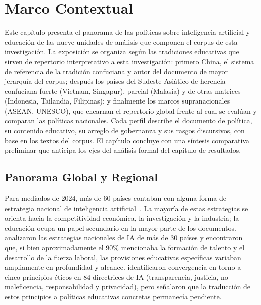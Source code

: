 \chapter{Marco Contextual}
\label{cap:marco-contextual}


Este capítulo presenta el panorama de las políticas sobre inteligencia artificial y educación de las nueve unidades de análisis que componen el corpus de esta investigación. La exposición se organiza según las tradiciones educativas que sirven de repertorio interpretativo a esta investigación: primero China, el sistema de referencia de la tradición confuciana y autor del documento de mayor jerarquía del corpus; después los países del Sudeste Asiático de herencia confuciana fuerte (Vietnam, Singapur), parcial (Malasia) y de otras matrices (Indonesia, Tailandia, Filipinas); y finalmente los marcos supranacionales (ASEAN, UNESCO), que encarnan el repertorio global frente al cual se evalúan y comparan las políticas nacionales. Cada perfil describe el documento de política, su contenido educativo, su arreglo de gobernanza y sus rasgos discursivos, con base en los textos del corpus. El capítulo concluye con una síntesis comparativa preliminar que anticipa los ejes del análisis formal del capítulo de resultados.


\section{Panorama Global y Regional}
\label{sec:panorama-global}

Para mediados de 2024, más de 60 países contaban con alguna forma de estrategia nacional de inteligencia artificial~\citep{maslej2024aiindex}. La mayoría de estas estrategias se orienta hacia la competitividad económica, la investigación y la industria; la educación ocupa un papel secundario en la mayor parte de los documentos. \citet{fatima2020aipolicy} analizaron las estrategias nacionales de IA de más de 30 países y encontraron que, si bien aproximadamente el 90\% mencionaba la formación de talento y el desarrollo de la fuerza laboral, las provisiones educativas específicas variaban ampliamente en profundidad y alcance. \citet{jobin2019landscape} identificaron convergencia en torno a cinco principios éticos en 84 directrices de IA (transparencia, justicia, no maleficencia, responsabilidad y privacidad), pero señalaron que la traducción de estos principios a políticas educativas concretas permanecía pendiente.


